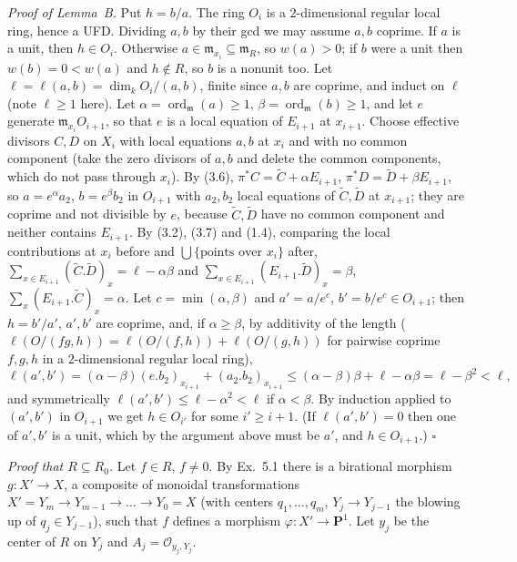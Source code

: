 \documentclass[11pt]{article}
\begin{document}
\emph{Proof of Lemma~B.} Put $h=b/a$. The ring $O_i$ is a $2$-dimensional regular local ring, hence a UFD. Dividing $a,b$ by their gcd we may assume $a,b$ coprime. If $a$ is a unit, then $h\in O_i$. Otherwise $a\in\mathfrak m_{x_i}\subseteq\mathfrak m_R$, so $w(a)>0$; if $b$ were a unit then $w(b)=0<w(a)$ and $h\notin R$, so $b$ is a nonunit too. Let $\ell=\ell(a,b)=\dim_kO_i/(a,b)$, finite since $a,b$ are coprime, and induct on $\ell$ (note $\ell\ge1$ here). Let $\alpha=\operatorname{ord}_{\mathfrak m}(a)\ge1$, $\beta=\operatorname{ord}_{\mathfrak m}(b)\ge1$, and let $e$ generate $\mathfrak m_{x_i}O_{i+1}$, so that $e$ is a local equation of $E_{i+1}$ at $x_{i+1}$. Choose effective divisors $C,D$ on $X_i$ with local equations $a,b$ at $x_i$ and with no common component (take the zero divisors of $a,b$ and delete the common components, which do not pass through $x_i$). By (3.6), $\pi^*C=\widetilde C+\alpha E_{i+1}$, $\pi^*D=\widetilde D+\beta E_{i+1}$, so $a=e^\alpha a_2$, $b=e^\beta b_2$ in $O_{i+1}$ with $a_2,b_2$ local equations of $\widetilde C,\widetilde D$ at $x_{i+1}$; they are coprime and not divisible by $e$, because $\widetilde C,\widetilde D$ have no common component and neither contains $E_{i+1}$. By (3.2), (3.7) and (1.4), comparing the local contributions at $x_i$ before and $\bigcup\{\text{points over }x_i\}$ after, $\sum_{x\in E_{i+1}}(\widetilde C.\widetilde D)_x=\ell-\alpha\beta$ and $\sum_{x\in E_{i+1}}(E_{i+1}.\widetilde D)_x=\beta$, $\sum_x(E_{i+1}.\widetilde C)_x=\alpha$. Let $c=\min(\alpha,\beta)$ and $a'=a/e^c$, $b'=b/e^c\in O_{i+1}$; then $h=b'/a'$, $a',b'$ are coprime, and, if $\alpha\ge\beta$, by additivity of the length ($\ell(O/(fg,h))=\ell(O/(f,h))+\ell(O/(g,h))$ for pairwise coprime $f,g,h$ in a $2$-dimensional regular local ring),
\[
\ell(a',b')=(\alpha-\beta)(e.b_2)_{x_{i+1}}+(a_2.b_2)_{x_{i+1}}\le(\alpha-\beta)\beta+\ell-\alpha\beta=\ell-\beta^2<\ell ,
\]
and symmetrically $\ell(a',b')\le\ell-\alpha^2<\ell$ if $\alpha<\beta$. By induction applied to $(a',b')$ in $O_{i+1}$ we get $h\in O_{i'}$ for some $i'\ge i+1$. (If $\ell(a',b')=0$ then one of $a',b'$ is a unit, which by the argument above must be $a'$, and $h\in O_{i+1}$.) $\square$

\emph{Proof that $R\subseteq R_0$.} Let $f\in R$, $f\ne0$. By Ex.~5.1 there is a birational morphism $g:X'\to X$, a composite of monoidal transformations $X'=Y_m\to Y_{m-1}\to\dots\to Y_0=X$ (with centers $q_1,\dots,q_m$, $Y_j\to Y_{j-1}$ the blowing up of $q_j\in Y_{j-1}$), such that $f$ defines a morphism $\varphi:X'\to\mathbf P^1$. Let $y_j$ be the center of $R$ on $Y_j$ and $A_j=\mathcal O_{y_j,Y_j}$.
\end{document}
